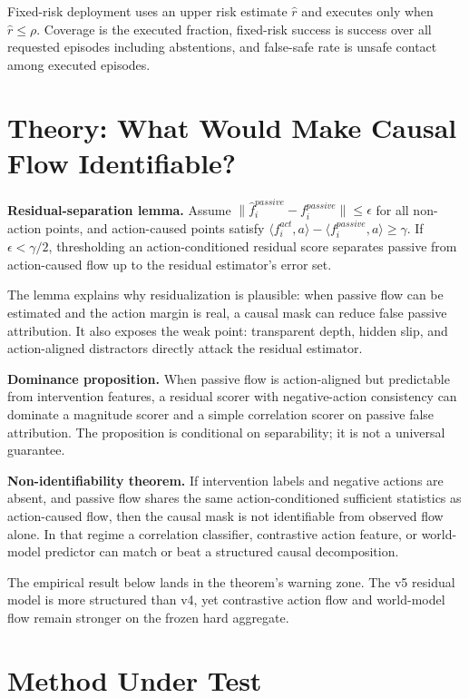 \documentclass{article}
\begin{document}
Fixed-risk deployment uses an upper risk estimate $\hat r$ and executes only when $\hat r\leq \rho$. Coverage is the executed fraction, fixed-risk success is success over all requested episodes including abstentions, and false-safe rate is unsafe contact among executed episodes.

\section{Theory: What Would Make Causal Flow Identifiable?}

\textbf{Residual-separation lemma.} Assume $\|\hat f_i^{passive}-f_i^{passive}\|\leq \epsilon$ for all non-action points, and action-caused points satisfy $\langle f_i^{act},a\rangle-\langle f_i^{passive},a\rangle\geq \gamma$. If $\epsilon<\gamma/2$, thresholding an action-conditioned residual score separates passive from action-caused flow up to the residual estimator's error set.

The lemma explains why residualization is plausible: when passive flow can be estimated and the action margin is real, a causal mask can reduce false passive attribution. It also exposes the weak point: transparent depth, hidden slip, and action-aligned distractors directly attack the residual estimator.

\textbf{Dominance proposition.} When passive flow is action-aligned but predictable from intervention features, a residual scorer with negative-action consistency can dominate a magnitude scorer and a simple correlation scorer on passive false attribution. The proposition is conditional on separability; it is not a universal guarantee.

\textbf{Non-identifiability theorem.} If intervention labels and negative actions are absent, and passive flow shares the same action-conditioned sufficient statistics as action-caused flow, then the causal mask is not identifiable from observed flow alone. In that regime a correlation classifier, contrastive action feature, or world-model predictor can match or beat a structured causal decomposition.

The empirical result below lands in the theorem's warning zone. The v5 residual model is more structured than v4, yet contrastive action flow and world-model flow remain stronger on the frozen hard aggregate.

\section{Method Under Test}
\end{document}
